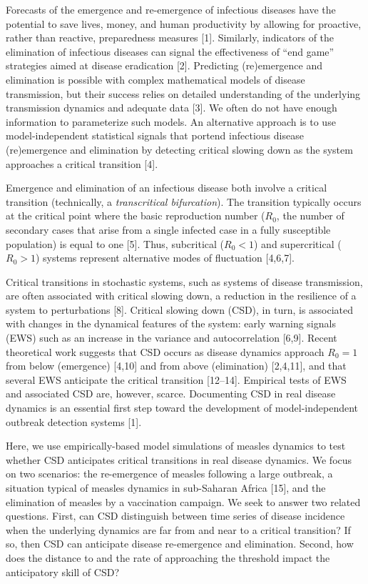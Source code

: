 \documentclass[3p]{elsarticle} %
\begin{document}
Forecasts of the emergence and re-emergence of infectious diseases have
the potential to save lives, money, and human productivity by allowing
for proactive, rather than reactive, preparedness measures {[}1{]}.
Similarly, indicators of the elimination of infectious diseases can
signal the effectiveness of ``end game'' strategies aimed at disease
eradication {[}2{]}. Predicting (re)emergence and elimination is
possible with complex mathematical models of disease transmission, but
their success relies on detailed understanding of the underlying
transmission dynamics and adequate data {[}3{]}. We often do not have
enough information to parameterize such models. An alternative approach
is to use model-independent statistical signals that portend infectious
disease (re)emergence and elimination by detecting critical slowing down
as the system approaches a critical transition {[}4{]}.

Emergence and elimination of an infectious disease both involve a
critical transition (technically, a \emph{transcritical bifurcation}).
The transition typically occurs at the critical point where the basic
reproduction number (\(R_0\), the number of secondary cases that arise
from a single infected case in a fully susceptible population) is equal
to one {[}5{]}. Thus, subcritical (\(R_0 < 1\)) and supercritical
(\(R_0 > 1\)) systems represent alternative modes of fluctuation
{[}4,6,7{]}.

Critical transitions in stochastic systems, such as systems of disease
transmission, are often associated with critical slowing down, a
reduction in the resilience of a system to perturbations {[}8{]}.
Critical slowing down (CSD), in turn, is associated with changes in the
dynamical features of the system: early warning signals (EWS) such as an
increase in the variance and autocorrelation {[}6,9{]}. Recent
theoretical work suggests that CSD occurs as disease dynamics approach
\(R_0 = 1\) from below (emergence) {[}4,10{]} and from above
(elimination) {[}2,4,11{]}, and that several EWS anticipate the critical
transition {[}12--14{]}. Empirical tests of EWS and associated CSD are,
however, scarce. Documenting CSD in real disease dynamics is an
essential first step toward the development of model-independent
outbreak detection systems {[}1{]}.

Here, we use empirically-based model simulations of measles dynamics to
test whether CSD anticipates critical transitions in real disease
dynamics. We focus on two scenarios: the re-emergence of measles
following a large outbreak, a situation typical of measles dynamics in
sub-Saharan Africa {[}15{]}, and the elimination of measles by a
vaccination campaign. We seek to answer two related questions. First,
can CSD distinguish between time series of disease incidence when the
underlying dynamics are far from and near to a critical transition? If
so, then CSD can anticipate disease re-emergence and elimination.
Second, how does the distance to and the rate of approaching the
threshold impact the anticipatory skill of CSD?
\end{document}
